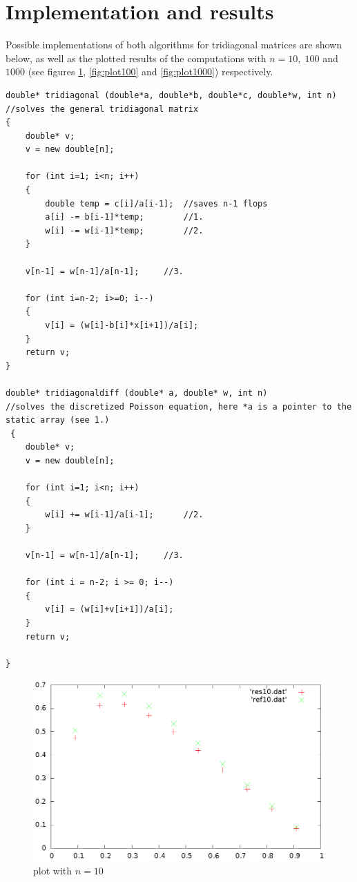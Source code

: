 \documentclass[11pt,a4wide]{article}
\begin{document}
\section{Implementation and results}
Possible implementations of both algorithms for tridiagonal matrices are shown below, as well as the plotted results of the computations with $n=10,\;100$ and $1000$ (see figures \ref{fig:plot10}, \ref{fig:plot100} and \ref{fig:plot1000}) respectively.
\begin{lstlisting}[title={solvers for tridiagonal matrices}]
double* tridiagonal (double*a, double*b, double*c, double*w, int n) 	//solves the general tridiagonal matrix
{
    double* v;
    v = new double[n];

    for (int i=1; i<n; i++)
    {
        double temp = c[i]/a[i-1];	//saves n-1 flops
        a[i] -= b[i-1]*temp;		//1.
        w[i] -= w[i-1]*temp;		//2.
    }

    v[n-1] = w[n-1]/a[n-1];		//3.		

    for (int i=n-2; i>=0; i--)
    {
        v[i] = (w[i]-b[i]*x[i+1])/a[i];
    }
    return v;
}

double* tridiagonaldiff (double* a, double* w, int n)	
//solves the discretized Poisson equation, here *a is a pointer to the static array (see 1.)
 {
    double* v;
    v = new double[n];

    for (int i=1; i<n; i++)
    {
        w[i] += w[i-1]/a[i-1];		//2.
    }

    v[n-1] = w[n-1]/a[n-1];		//3.

    for (int i = n-2; i >= 0; i--)
    {
        v[i] = (w[i]+v[i+1])/a[i];
    }
    return v;

}
\end{lstlisting}
\begin{figure}[b]
	\centering
\includegraphics[scale=0.5,angle=-90]{plot10.eps}
\caption{plot with $n=10$}
	\label{fig:plot10}
\end{figure}
\end{document}

